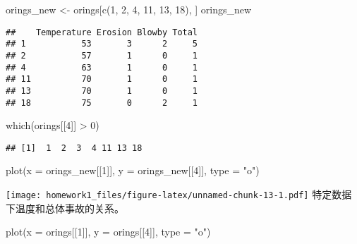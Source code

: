 \documentclass[
]{article}
\newenvironment{Shaded}{\begin{snugshade}}{\end{snugshade}}
\newcommand{\AttributeTok}[1]{\textcolor[rgb]{0.77,0.63,0.00}{#1}}
\newcommand{\DecValTok}[1]{\textcolor[rgb]{0.00,0.00,0.81}{#1}}
\newcommand{\FunctionTok}[1]{\textcolor[rgb]{0.00,0.00,0.00}{#1}}
\newcommand{\NormalTok}[1]{#1}
\newcommand{\OtherTok}[1]{\textcolor[rgb]{0.56,0.35,0.01}{#1}}
\newcommand{\SpecialCharTok}[1]{\textcolor[rgb]{0.00,0.00,0.00}{#1}}
\newcommand{\StringTok}[1]{\textcolor[rgb]{0.31,0.60,0.02}{#1}}
\begin{document}
\begin{Shaded}
\begin{Highlighting}[]
\NormalTok{orings\_new }\OtherTok{\textless{}{-}}\NormalTok{ orings[}\FunctionTok{c}\NormalTok{(}\DecValTok{1}\NormalTok{, }\DecValTok{2}\NormalTok{, }\DecValTok{4}\NormalTok{, }\DecValTok{11}\NormalTok{, }\DecValTok{13}\NormalTok{, }\DecValTok{18}\NormalTok{), ]}
\NormalTok{orings\_new}
\end{Highlighting}
\end{Shaded}

\begin{verbatim}
##    Temperature Erosion Blowby Total
## 1           53       3      2     5
## 2           57       1      0     1
## 4           63       1      0     1
## 11          70       1      0     1
## 13          70       1      0     1
## 18          75       0      2     1
\end{verbatim}

\begin{Shaded}
\begin{Highlighting}[]
\FunctionTok{which}\NormalTok{(orings[[}\DecValTok{4}\NormalTok{]] }\SpecialCharTok{\textgreater{}} \DecValTok{0}\NormalTok{)}
\end{Highlighting}
\end{Shaded}

\begin{verbatim}
## [1]  1  2  3  4 11 13 18
\end{verbatim}

\begin{Shaded}
\begin{Highlighting}[]
\FunctionTok{plot}\NormalTok{(}\AttributeTok{x =}\NormalTok{ orings\_new[[}\DecValTok{1}\NormalTok{]], }\AttributeTok{y =}\NormalTok{ orings\_new[[}\DecValTok{4}\NormalTok{]], }\AttributeTok{type =} \StringTok{"o"}\NormalTok{)}
\end{Highlighting}
\end{Shaded}

\texttt{[image: homework1\_files/figure-latex/unnamed-chunk-13-1.pdf]}
特定数据下温度和总体事故的关系。

\begin{Shaded}
\begin{Highlighting}[]
\FunctionTok{plot}\NormalTok{(}\AttributeTok{x =}\NormalTok{ orings[[}\DecValTok{1}\NormalTok{]], }\AttributeTok{y =}\NormalTok{ orings[[}\DecValTok{4}\NormalTok{]], }\AttributeTok{type =} \StringTok{"o"}\NormalTok{)}
\end{Highlighting}
\end{Shaded}
\end{document}
